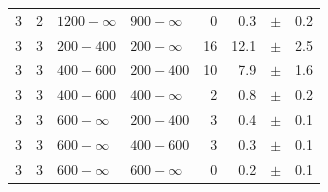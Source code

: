 \begin{table}[!h]
\begin{tabular}{rrllrrcl}
		3 & 2 & $1200- \infty$ & $900-\infty$ &      0 &      0.3 &$\pm$&    
		0.2 \\
		3\T & 3 & $ 200- 400$ & $200-\infty$ &     16 &     12.1 &$\pm$&    2.5 
		\\
		3\T & 3 & $ 400- 600$ & $200-400$ &     10 &      7.9 &$\pm$&    1.6 \\
		3 & 3 & $ 400- 600$ & $400-\infty$ &      2 &      0.8 &$\pm$&    0.2 \\
		3\T & 3 & $ 600- \infty$ & $200-400$ &      3 &      0.4 &$\pm$&    0.1 
		\\
		3 & 3 & $ 600- \infty$ & $400-600$ &      3 &      0.3 &$\pm$&    0.1 \\
		3 & 3 & $ 600- \infty$ & $600-\infty$ &      0 &      0.2 &$\pm$&    
		0.1 \\
		\hline
	\end{tabular}
\end{table}

